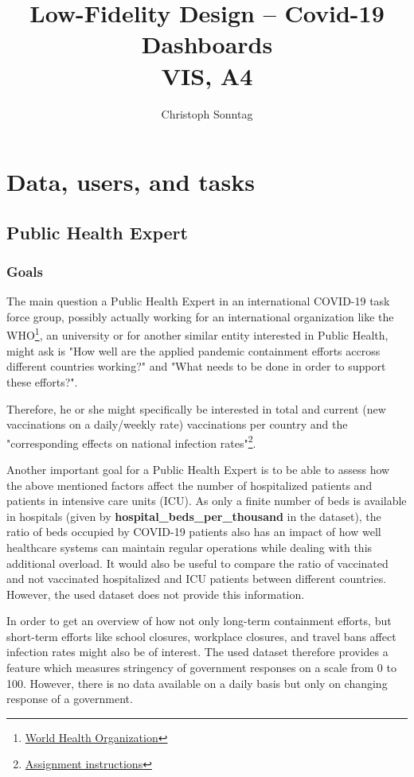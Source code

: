 \documentclass[11pt]{article}
\title{Low-Fidelity Design -- Covid-19 Dashboards\\ \small{VIS, A4}}
\author{Christoph Sonntag}
\begin{document}
\maketitle
{}


\section{Data, users, and tasks}
\subsection{Public Health Expert}
\subsubsection{Goals}
The main question a Public Health Expert in an international COVID-19 task force group, possibly actually working for an international organization like the 
WHO\footnote{\href{https://www.who.int/}{World Health Organization}}, an university or for another similar entity interested in Public Health, 
might ask is "How well are the applied pandemic containment efforts accross different countries working?" and "What needs to be done in order to support these efforts?". 

Therefore, he or she might specifically be interested in total and current (new vaccinations on a daily/weekly rate) vaccinations per country and the 
"corresponding effects on national infection rates"\footnote{\href{http://vda.univie.ac.at/Teaching/Vis/21w/a4.html}{Assignment instructions}}. 

Another important goal for a Public Health Expert is to be able to assess how the above mentioned factors affect the number of hospitalized patients and 
patients in intensive care units (ICU). As only a finite number of beds is available in hospitals (given by \textbf{hospital\_beds\_per\_thousand} in the dataset), 
the ratio of beds occupied by COVID-19 patients also 
has an impact of how well healthcare systems can maintain regular operations while dealing with this additional overload. It would also be useful to compare 
the ratio of vaccinated and not vaccinated hospitalized and ICU patients between different countries. However, the used dataset does not provide this information. 

In order to get an overview of how not only long-term containment efforts, but short-term efforts like school closures, workplace closures, and travel bans affect 
infection rates might also be of interest. The used dataset therefore provides a feature which measures stringency of government responses on a scale from 0 to 100. 
However, there is no data available on a daily basis but only on changing response of a government.
\end{document}
